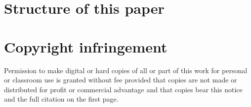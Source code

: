 \section{Structure of this paper}
\label{sec:paper_structure}






\section{Copyright infringement}
\label{sec:copyright}
Permission to make digital or hard copies of all or part of this work for personal or classroom use is granted without fee provided that copies are not made or distributed for profit or commercial advantage and that copies bear this notice and the full citation on the first page. 







